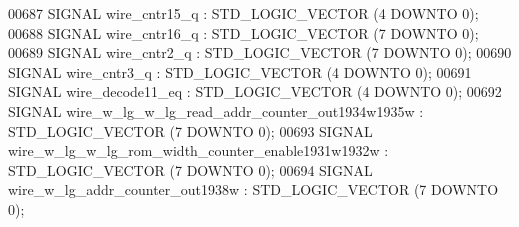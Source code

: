 \begin{DoxyCode}
{00687      \textcolor{keywordflow}{SIGNAL}  \textcolor{vhdlchar}{wire_cntr15_q}  \textcolor{vhdlchar}{:}   \textcolor{comment}{STD\_LOGIC\_VECTOR} \textcolor{vhdlchar}{(}\textcolor{vhdllogic}{}\textcolor{vhdllogic}{4} \textcolor{keywordflow}{DOWNTO} \textcolor{vhdllogic}{}\textcolor{vhdllogic}{0}\textcolor{vhdlchar}{)};
00688      \textcolor{keywordflow}{SIGNAL}  \textcolor{vhdlchar}{wire_cntr16_q}  \textcolor{vhdlchar}{:}   \textcolor{comment}{STD\_LOGIC\_VECTOR} \textcolor{vhdlchar}{(}\textcolor{vhdllogic}{}\textcolor{vhdllogic}{7} \textcolor{keywordflow}{DOWNTO} \textcolor{vhdllogic}{}\textcolor{vhdllogic}{0}\textcolor{vhdlchar}{)};
00689      \textcolor{keywordflow}{SIGNAL}  \textcolor{vhdlchar}{wire_cntr2_q}   \textcolor{vhdlchar}{:}   \textcolor{comment}{STD\_LOGIC\_VECTOR} \textcolor{vhdlchar}{(}\textcolor{vhdllogic}{}\textcolor{vhdllogic}{7} \textcolor{keywordflow}{DOWNTO} \textcolor{vhdllogic}{}\textcolor{vhdllogic}{0}\textcolor{vhdlchar}{)};
00690      \textcolor{keywordflow}{SIGNAL}  \textcolor{vhdlchar}{wire_cntr3_q}   \textcolor{vhdlchar}{:}   \textcolor{comment}{STD\_LOGIC\_VECTOR} \textcolor{vhdlchar}{(}\textcolor{vhdllogic}{}\textcolor{vhdllogic}{4} \textcolor{keywordflow}{DOWNTO} \textcolor{vhdllogic}{}\textcolor{vhdllogic}{0}\textcolor{vhdlchar}{)};
00691      \textcolor{keywordflow}{SIGNAL}  \textcolor{vhdlchar}{wire_decode11_eq}   \textcolor{vhdlchar}{:}   \textcolor{comment}{STD\_LOGIC\_VECTOR} \textcolor{vhdlchar}{(}\textcolor{vhdllogic}{}\textcolor{vhdllogic}{4} \textcolor{keywordflow}{DOWNTO} \textcolor{vhdllogic}{}\textcolor{vhdllogic}{0}\textcolor{vhdlchar}{)};
00692      \textcolor{keywordflow}{SIGNAL}  \textcolor{vhdlchar}{wire_w_lg_w_lg_read_addr_counter_out1934w1935w} \textcolor{vhdlchar}{:}   \textcolor{comment}{STD\_LOGIC\_VECTOR} \textcolor{vhdlchar}{(}\textcolor{vhdllogic}{}\textcolor{vhdllogic}{7} \textcolor{keywordflow}{DOWNTO} \textcolor{vhdllogic}{}\textcolor{vhdllogic}{0}\textcolor{vhdlchar}{)};
00693      \textcolor{keywordflow}{SIGNAL}  \textcolor{vhdlchar}{wire_w_lg_w_lg_rom_width_counter_enable1931w1932w}  \textcolor{vhdlchar}{:}   \textcolor{comment}{STD\_LOGIC\_VECTOR} \textcolor{vhdlchar}{(}\textcolor{vhdllogic}{}\textcolor{vhdllogic}{7} \textcolor{keywordflow}{DOWNTO} \textcolor{vhdllogic}{}\textcolor{vhdllogic}{0}\textcolor{vhdlchar}{)};
00694      \textcolor{keywordflow}{SIGNAL}  \textcolor{vhdlchar}{wire_w_lg_addr_counter_out1938w}    \textcolor{vhdlchar}{:}   \textcolor{comment}{STD\_LOGIC\_VECTOR} \textcolor{vhdlchar}{(}\textcolor{vhdllogic}{}\textcolor{vhdllogic}{7} \textcolor{keywordflow}{DOWNTO} \textcolor{vhdllogic}{}\textcolor{vhdllogic}{0}\textcolor{vhdlchar}{)};
}
\end{DoxyCode}
